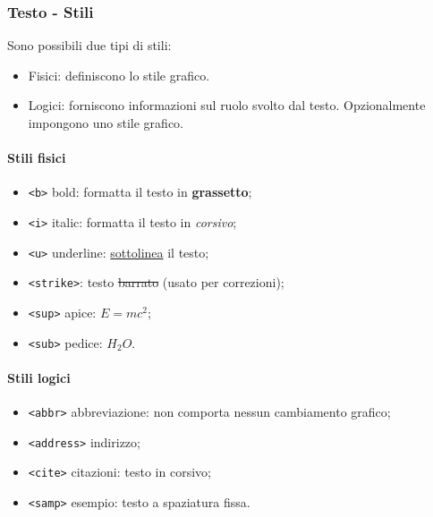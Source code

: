 \documentclass{article}
\begin{document}
\subsubsection{Testo - Stili}
Sono possibili due tipi di stili:
\begin{itemize}
    \item Fisici: definiscono lo stile grafico.
    \item Logici: forniscono informazioni sul ruolo svolto dal testo. Opzionalmente impongono uno stile grafico.
\end{itemize}
\paragraph{Stili fisici} \mbox{}
\begin{itemize}
    \item \texttt{<b>} bold: formatta il testo in \textbf{grassetto};
    \item \texttt{<i>} italic: formatta il testo in \textit{corsivo};
    \item \texttt{<u>} underline: \underline{sottolinea} il testo;
    \item \texttt{<strike>}: testo \sout{barrato} (usato per correzioni);
    \item \texttt{<sup>} apice: $E=mc^2$;
    \item \texttt{<sub>} pedice: $H_2O$.
\end{itemize}
\paragraph{Stili logici} \mbox{}
\begin{itemize}
    \item \texttt{<abbr>} abbreviazione: non comporta nessun cambiamento grafico;
    \item \texttt{<address>} indirizzo;
    \item \texttt{<cite>} citazioni: testo in corsivo;
    \item \texttt{<samp>} esempio: testo a spaziatura fissa.
\end{itemize}
\end{document}
